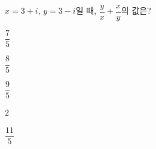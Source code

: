 $x=3+i$, $y=3-i$일 때, $\dfrac{y}{x}+\dfrac{x}{y}$의 값은?
\begin{choices32}{\rule[-3ex]{0pt}{8ex}$\dfrac{7}{5}$}{\rule[-3ex]{0pt}{8ex}$\dfrac{8}{5}$}{\rule[-3ex]{0pt}{8ex}$\dfrac{9}{5}$}{\rule[-3ex]{0pt}{8ex}$2$}{\rule[-3ex]{0pt}{8ex}$\dfrac{11}{5}$}\end{choices32}
